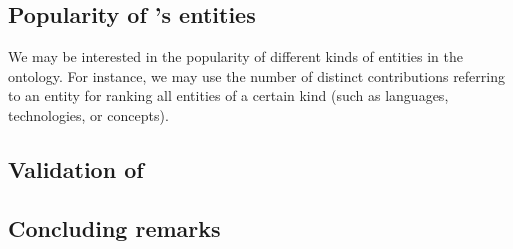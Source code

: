 \documentclass{llncs}
\begin{document}
\subsection{Popularity of \solasote's entities}

We may be interested in the popularity of different kinds of entities
in the ontology. For instance, we may use the number of distinct
contributions referring to an entity for ranking all entities of a
certain kind (such as languages, technologies, or concepts). 










\subsection{Validation of \solasote}






\subsection{Concluding remarks}



\begin{comment}

























\end{comment}
\end{document}
